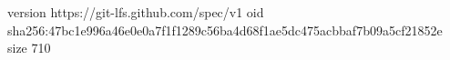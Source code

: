 version https://git-lfs.github.com/spec/v1
oid sha256:47bc1e996a46e0e0a7f1f1289c56ba4d68f1ae5dc475acbbaf7b09a5cf21852e
size 710
